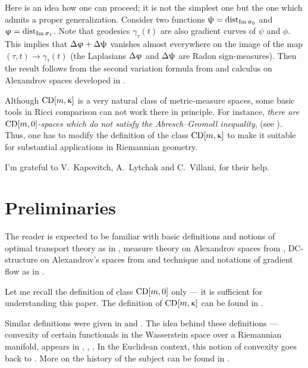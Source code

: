 \documentclass[oneside,a4paper]{article}
\begin{document}
Here is an idea how one can proceed; 
it is not the simplest one but the one which admits a proper generalization.
Consider two functions $\uppsi=\mathop{\rm dist}\nolimits_{\mathop{\rm Im}\nolimits\upsigma_0}$ and $\upvarphi=\mathop{\rm dist}\nolimits_{\mathop{\rm Im}\nolimits\upsigma_1}$.
Note that geodesics $\gamma_\tau(t)$ are also gradient curves of $\psi$ and $\phi$.
This implies that $\Delta\upvarphi+\Delta\uppsi$ vanishes almost everywhere on the image of the map $(\tau,t)\to\gamma_\tau(t)$ (the Laplasians $\Delta\upvarphi$ and $\Delta\uppsi$ are Radon sign-measures).
Then the result follows from the second variation formula from \cite{petrunin:parallel}
and calculus on Alexandrov spaces developed in \cite{perelman:DC}.



Although $\CD m \kappa$ is a very natural class of metric-measure spaces, 
some basic tools in Ricci comparison can not work there in principle.
For instance,
\emph{there are $\CD m 0$-spaces which do not satisfy the Abresch--Gromoll inequality}, (see \cite{AG}).
Thus, one has to modify the definition of the class $\CD m \kappa$
to make it suitable for substantial applications in Riemannian geometry.


\smallskip

I'm grateful to 
V.~Kapovitch,
A.~Lytchak 
and C.~Villani, 
for their help.

\section{Preliminaries}

The reader is expected to be familiar with 
basic definitions and notions of optimal transport  theory as in \cite{villani}, 
measure theory on Alexandrov spaces from \cite{BGP}, 
DC-structure on Alexandrov's spaces from \cite{perelman:DC} 
and technique and notations of gradient flow as in \cite{petrunin:survey}.


Let me recall the definition of class $\CD m0$ only --- it is sufficient for understanding this paper.
The definition of $\CD m\kappa$ can be found in \cite[29.8]{villani}.

Similar definitions were given in \cite{lott-villani} and \cite{sturm}.
The idea behind these definitions --- convexity of certain functionals in the Wasserstein space
over a Riemannian manifold, appears in \cite{otto-villani}, \cite{CMS}, \cite{SvR}.
In the Euclidean context, this notion of convexity goes back to \cite{McC}.
More on the history of the subject can be found in \cite{villani}.
\end{document}
